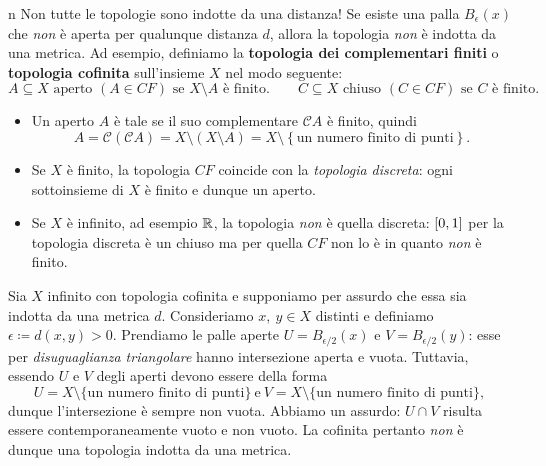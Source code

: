 \begin{warning}{n}
	Non tutte le topologie sono indotte da una distanza! Se esiste una palla $B_\epsilon\left(x\right)$ che \textit{non} è aperta per qualunque distanza $d$, allora la topologia \textit{non} è indotta da una metrica. Ad esempio, definiamo la \textbf{topologia dei complementari finiti} o \textbf{topologia cofinita} sull'insieme $X$ nel modo seguente:
	\begin{equation*}
		A\subseteq X \text{ aperto } \left(A\in CF\right) \text{ se }  X\setminus A \text{ è finito.}\qquad
		C\subseteq X \text{ chiuso } \left(C\in CF\right) \text{ se }  C \text{ è finito.}
	\end{equation*}
	\begin{itemize}
		\item Un aperto $A$ è tale se il suo complementare $\mathcal{C}A$ è finito, quindi
		\begin{equation*}
			A=\mathcal{C}\left(\mathcal{C}A\right)=X\setminus\left(X\setminus A\right)=X\setminus\left\{\text{un numero finito di punti}\right\}.
		\end{equation*}
		\item Se $X$ è finito, la topologia $CF$ coincide con la \textit{topologia discreta}: ogni sottoinsieme di $X$ è finito e dunque un aperto.
		\item Se $X$ è infinito, ad esempio $\mathbb{R}$, la topologia \textit{non} è quella discreta: $\left[0, 1\right]$ per la topologia discreta è un chiuso ma per quella $CF$ non lo è in quanto \textit{non} è finito.
	\end{itemize}
Sia $X$ infinito con topologia cofinita e supponiamo per assurdo che essa sia indotta da una metrica $d$. Consideriamo $x,\ y\in X$ distinti e definiamo $\epsilon \coloneqq d(x,y) >0$. Prendiamo le palle aperte $U=B_{\epsilon/2}\left(x\right)$ e $V=B_{\epsilon/2}\left(y\right)$: esse per \textit{disuguaglianza triangolare} hanno intersezione aperta e vuota. Tuttavia, essendo $U$ e $V$ degli aperti devono essere della forma
\begin{equation*}
	U=X\setminus \{\text{un numero finito di punti}\}\ \text{e}\ V=X\setminus \{\text{un numero finito di punti}\},
\end{equation*}
dunque l'intersezione è sempre non vuota. Abbiamo un assurdo: $U\cap V$ risulta essere contemporaneamente vuoto e non vuoto. La cofinita pertanto \textit{non} è dunque una topologia indotta da una metrica.
\end{warning}
